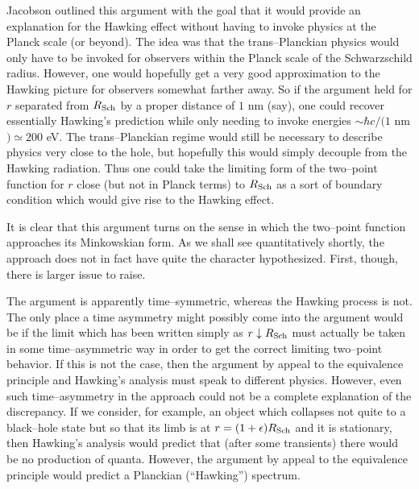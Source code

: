 Jacobson 
outlined this argument with the goal that it would provide an
explanation for the Hawking effect without having to invoke physics at the
Planck scale (or beyond).  The idea was that the trans--Planckian physics would
only have to be invoked for observers within the Planck scale of the
Schwarzschild radius.  However, one would hopefully get a very good
approximation to the Hawking picture for observers somewhat farther away.  So if
the argument held for $r$ separated from $R_{\rm Sch}$ by a proper distance of
$1$ nm (say), one could recover essentially Hawking's prediction while only
needing to invoke energies $\sim \hbar c/(1$ nm$)\simeq 200$ eV.  The
trans--Planckian regime would still be necessary to describe physics very close
to the hole, but hopefully this would simply decouple from the Hawking
radiation.  Thus one could take the limiting form of the two--point function for
$r$ close (but not in Planck terms) to $R_{\rm Sch}$ as a sort of boundary
condition which would give rise to the Hawking effect.

It is clear that this argument turns on the sense in which the two--point
function approaches its Minkowskian form.  As we shall see quantitatively
shortly, the approach does not in fact have quite the character
hypothesized.  First, though, there is larger issue to raise.

The argument is apparently time--symmetric, whereas the Hawking process
is not.  The only place a time asymmetry might possibly come into the
argument would be if the limit which has been written simply as $r\downarrow
R_{\rm Sch}$ must actually be taken in some time--asymmetric way in order to
get the correct limiting two--point behavior. If this is not the case,
then the argument by appeal to the equivalence principle 
and Hawking's analysis must speak to different physics.   However,
even such time--asymmetry in the approach could not be a complete explanation
of the discrepancy. If we consider, for example, an object which collapses not
quite to a black--hole state but so that its limb is at $r=(1+\epsilon )R_{\rm
Sch}$ and it is stationary, then Hawking's analysis would predict that (after
some transients) there would be no production of quanta.  However, the 
argument by appeal to the equivalence principle
would predict a Planckian (``Hawking'') spectrum.


